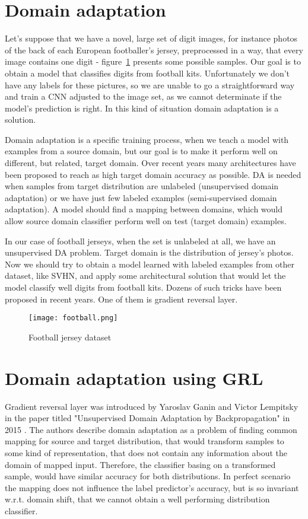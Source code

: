 \documentclass[shortabstract, inz, english]{iithesis}
\begin{document}
\section{Domain adaptation}
Let's suppose that we have a novel, large set of digit images, for instance photos of the back of each European footballer's jersey, preprocessed in a way, that every image contains one digit - figure~\ref{fig:football} presents some possible samples. Our goal is to obtain a model that classifies digits from football kits. Unfortunately we don't have any labels for these pictures, so we are unable to go a straightforward way and train a CNN adjusted to the image set, as we cannot determinate if the model's prediction is right. In this kind of situation domain adaptation is a solution.
\par
Domain adaptation is a specific training process, when we teach a model with examples from a source domain, but our goal is to make it perform well on different, but related, target domain. Over recent years many architectures have been proposed to reach as high target domain accuracy as possible. DA is needed when samples from target distribution are unlabeled (unsupervised domain adaptation) or we have just few labeled examples (semi-supervised domain adaptation). A model should find a mapping between domains, which would allow source domain classifier perform well on test (target domain) examples.
\par
In our case of football jerseys, when the set is unlabeled at all, we have an unsupervised DA problem. Target domain is the distribution of jersey's photos. Now we should try to obtain a model learned with labeled examples from other dataset, like SVHN, and apply some architectural solution that would let the model classify well digits from football kits. Dozens of such tricks have been proposed in recent years. One of them is gradient reversal layer.

\begin{figure}%
    \centering
    \texttt{[image: football.png]}%
    \caption{Football jersey dataset}
    \label{fig:football}%
\end{figure}


\section{Domain adaptation using GRL}
Gradient reversal layer was introduced by Yaroslav Ganin and Victor Lempitsky in the paper titled "Unsupervised Domain Adaptation by Backpropagation" in 2015 \cite{pmlr-v37-ganin15}. The authors describe domain adaptation as a problem of finding common mapping for source and target distribution, that would transform samples to some kind of representation, that does not contain any information about the domain of mapped input. Therefore, the classifier basing on a transformed sample, would have similar accuracy for both distributions. In perfect scenario the mapping does not influence the label predictor's accuracy, but is so invariant w.r.t. domain shift, that we cannot obtain a well performing distribution classifier. 
\end{document}
